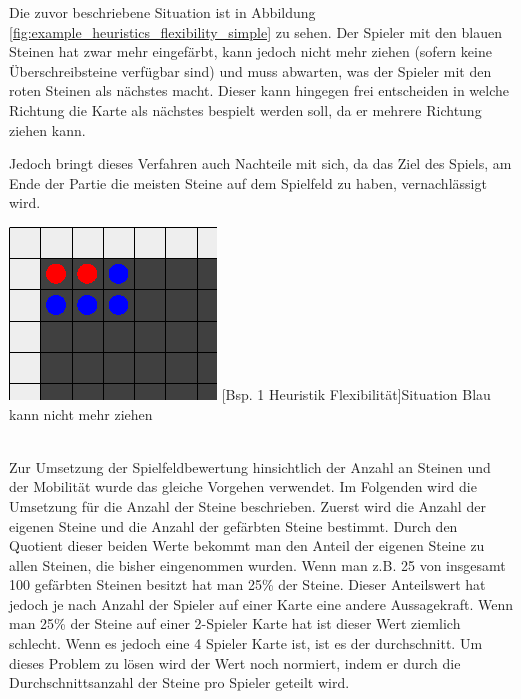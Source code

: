 \documentclass[12pt,a4paper,bibliography=totocnumbered,listof=totocnumbered]{article}
\begin{document}
Die zuvor beschriebene Situation ist in Abbildung \ref{fig:example_heuristics_flexibility_simple} zu sehen. Der Spieler mit den blauen Steinen hat zwar mehr eingefärbt, kann jedoch nicht mehr ziehen (sofern keine Überschreibsteine verfügbar sind) und muss abwarten, was der Spieler mit den roten Steinen als nächstes macht. Dieser kann hingegen frei entscheiden in welche Richtung die Karte als nächstes bespielt werden soll, da er mehrere Richtung ziehen kann.

Jedoch bringt dieses Verfahren auch Nachteile mit sich, da das Ziel des Spiels, am Ende der Partie die meisten Steine auf dem Spielfeld zu haben, vernachlässigt wird.

\vspace{1em}
\begin{minipage}{\linewidth}
	\centering
	\includegraphics[width=0.3\linewidth]{pics/heuristics_flexibility_simple_v2.png}
	[Bsp. 1 Heuristik Flexibilität]{Situation Blau kann nicht mehr ziehen}
	\label{fig:example_heuristics_flexibility_simple}
\end{minipage}
\\


Zur Umsetzung der Spielfeldbewertung hinsichtlich der Anzahl an Steinen und der Mobilität wurde das gleiche Vorgehen verwendet. Im Folgenden wird die Umsetzung für die Anzahl der Steine beschrieben.
Zuerst wird die Anzahl der eigenen Steine und die Anzahl der gefärbten Steine bestimmt. Durch den Quotient dieser beiden Werte bekommt man den Anteil der eigenen Steine zu allen Steinen, die bisher eingenommen wurden. Wenn man z.B. 25 von insgesamt 100 gefärbten Steinen besitzt hat man 25\% der Steine. Dieser Anteilswert hat jedoch je nach Anzahl der Spieler auf einer Karte eine andere Aussagekraft. Wenn man 25\% der Steine auf einer 2-Spieler Karte hat ist dieser Wert ziemlich schlecht. Wenn es jedoch eine 4 Spieler Karte ist, ist es der durchschnitt. Um dieses Problem zu lösen wird der Wert noch normiert, indem er durch die Durchschnittsanzahl der Steine pro Spieler geteilt wird. 
\end{document}
